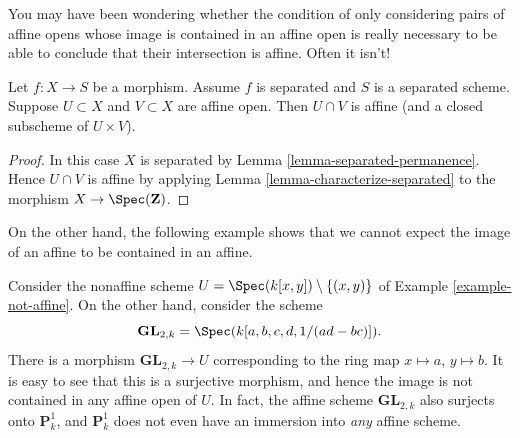 \noindent
You may have been wondering whether the condition
of only considering pairs of affine opens whose image is contained
in an affine open is really necessary to be able to conclude
that their intersection is affine. Often it isn't!

\begin{lemma}
\label{lemma-curiosity}
Let $f : X \to S$ be a morphism.
Assume $f$ is separated and $S$ is a separated scheme.
Suppose $U \subset X$ and $V \subset X$ are affine open.
Then $U \cap V$ is affine (and a closed subscheme of $U \times V$).
\end{lemma}

\begin{proof}
In this case $X$ is separated by Lemma \ref{lemma-separated-permanence}.
Hence $U \cap V$ is affine by
applying Lemma \ref{lemma-characterize-separated} to the
morphism $X \to \Spec(\mathbf{Z})$.
\end{proof}

\noindent
On the other hand, the following example shows that we cannot
expect the image of an affine to be contained in an affine.

\begin{example}
\label{example-image-affine-projective}
Consider the nonaffine scheme
$U = \Spec(k[x, y]) \setminus \{(x, y)\}$ of
Example \ref{example-not-affine}. On the other hand, consider the
scheme
$$
\mathbf{GL}_{2, k} = \Spec(k[a, b, c, d, 1/(ad - bc)]).
$$
There is a morphism $\mathbf{GL}_{2, k} \to U$ corresponding
to the ring map $x \mapsto a$, $y \mapsto b$. It is easy to see that
this is a surjective morphism, and hence the image is not contained
in any affine open of $U$. In fact, the affine scheme
$\mathbf{GL}_{2, k}$ also surjects onto $\mathbf{P}^1_k$, and
$\mathbf{P}^1_k$ does not even have an immersion into {\it any} affine scheme.
\end{example}

